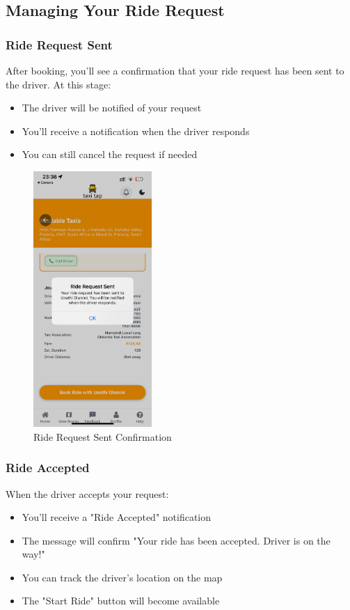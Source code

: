 \documentclass[12pt]{article}
\begin{document}
\subsection{Managing Your Ride Request}

\subsubsection{Ride Request Sent}
After booking, you'll see a confirmation that your ride request has been sent to the driver. At this stage:
\begin{itemize}
    \item The driver will be notified of your request
    \item You'll receive a notification when the driver responds
    \item You can still cancel the request if needed
\end{itemize}

\begin{figure}[H]
  \centering
  \includegraphics[width=0.4\textwidth]{ride_request_sent.png}
  \caption{Ride Request Sent Confirmation}
\end{figure}

\subsubsection{Ride Accepted}
When the driver accepts your request:
\begin{itemize}
    \item You'll receive a "Ride Accepted" notification
    \item The message will confirm "Your ride has been accepted. Driver is on the way!"
    \item You can track the driver's location on the map
    \item The "Start Ride" button will become available
\end{itemize}
\end{document}
